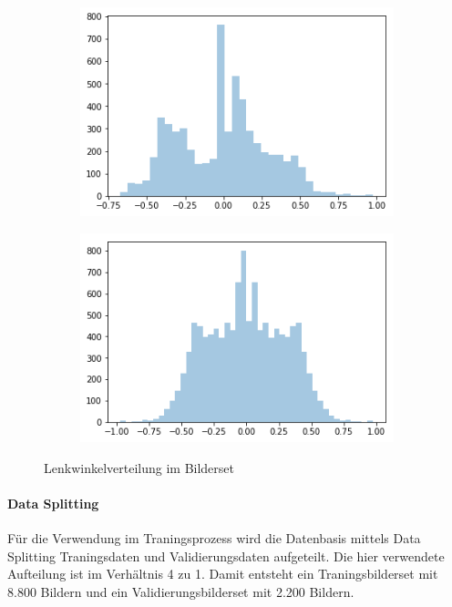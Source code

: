 \begin{figure}[h]
	\centering
	\begin{subfigure}{.5\textwidth}
	\centering
		  \includegraphics[width=1\linewidth]{figures/steeringAngleDistribution.png}
	 	  \caption{}
		  \label{fig:anglesa}
	\end{subfigure}%
	\begin{subfigure}{.5\textwidth}
	\centering
		  \includegraphics[width=1\linewidth]{figures/steeringAngleDistributionFlipped.png}
	 	  \caption{}
		  \label{fig:anglesb}
	\end{subfigure}%
	\caption{Lenkwinkelverteilung im Bilderset}
	\label{fig:steuerungswinkel}
\end{figure}%

\paragraph{Data Splitting}
Für die Verwendung im Traningsprozess wird die Datenbasis mittels Data Splitting \cite{picard1990data} \cite{reitermanova2010data}  Traningsdaten und Validierungsdaten aufgeteilt. Die hier verwendete Aufteilung ist im Verhältnis 4 zu 1. Damit entsteht ein Traningsbilderset mit 8.800 Bildern und ein Validierungsbilderset mit 2.200 Bildern.

